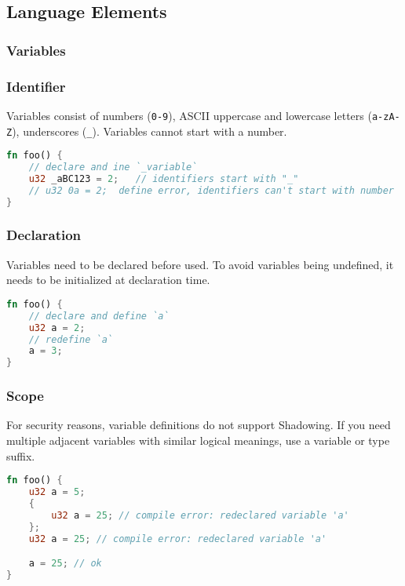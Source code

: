 \subsection{Language Elements}\label{section: ola-lang-language-elements}


\subsubsection{Variables}

\subsubsection*{Identifier}

Variables consist of numbers (\texttt{0-9}), ASCII uppercase and lowercase letters (\texttt{a-zA-Z}), underscores (\texttt{\_}).
Variables cannot start with a number.

\begin{lstlisting}[language=rust]
fn foo() {
    // declare and ine `_variable`
    u32 _aBC123 = 2;   // identifiers start with "_"
    // u32 0a = 2;  define error, identifiers can't start with number
}
\end{lstlisting}

\subsubsection*{Declaration}

Variables need to be declared before used. To avoid variables being undefined, it needs to be initialized at declaration time. 

\begin{lstlisting}[language=rust]
fn foo() {
    // declare and define `a`
    u32 a = 2;
    // redefine `a`
    a = 3;
}
\end{lstlisting}

\subsubsection*{Scope}

For security reasons, variable definitions do not support Shadowing. 
If you need multiple adjacent variables with similar logical meanings, use a variable or type suffix.

\begin{lstlisting}[language=rust]
fn foo() {
    u32 a = 5;
    {        
        u32 a = 25; // compile error: redeclared variable 'a'
    };    
    u32 a = 25; // compile error: redeclared variable 'a'

    a = 25; // ok
}
\end{lstlisting}

